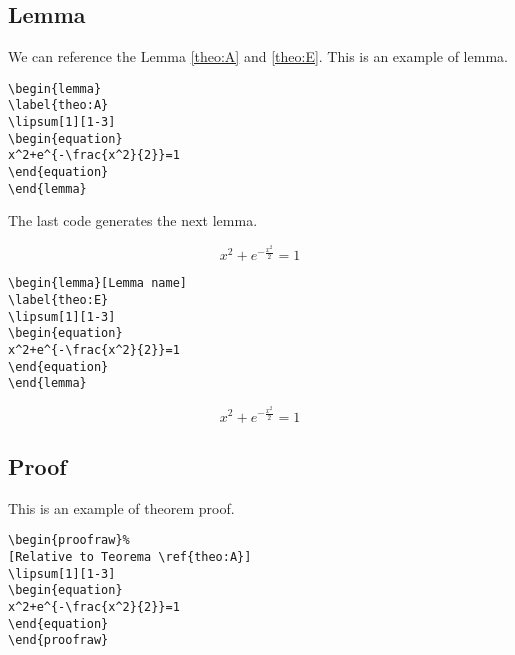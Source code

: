 \subsection{Lemma}

We can reference the Lemma \ref{theo:A} and \ref{theo:E}.
This is an example of lemma.
\begin{highlightbox}
\begin{verbatim}
\begin{lemma}
\label{theo:A}
\lipsum[1][1-3]
\begin{equation}
x^2+e^{-\frac{x^2}{2}}=1
\end{equation}
\end{lemma}
\end{verbatim}
\end{highlightbox}

The last code generates the next lemma.
\begin{lemma}
\label{theo:A}
\lipsum[1][1-3]
\begin{equation}
x^2+e^{-\frac{x^2}{2}}=1
\end{equation}
\end{lemma}



\begin{highlightbox}
\begin{verbatim}
\begin{lemma}[Lemma name]
\label{theo:E}
\lipsum[1][1-3]
\begin{equation}
x^2+e^{-\frac{x^2}{2}}=1
\end{equation}
\end{lemma}
\end{verbatim}
\end{highlightbox}
\begin{lemma}
\label{theo:E}
\lipsum[1][1-3]
\begin{equation}
x^2+e^{-\frac{x^2}{2}}=1
\end{equation}
\end{lemma}


\subsection{Proof}
This is an example of theorem proof.
\begin{highlightbox}
\begin{verbatim}
\begin{proofraw}%
[Relative to Teorema \ref{theo:A}]
\lipsum[1][1-3]
\begin{equation}
x^2+e^{-\frac{x^2}{2}}=1
\end{equation}
\end{proofraw}
\end{verbatim}
\end{highlightbox}

